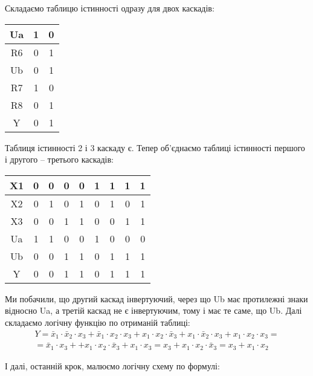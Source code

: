 \documentclass[a4paper,14pt]{extreport}
\begin{document}
Складаємо таблицю істинності одразу для двох каскадів:

\begin{table}[h]
  \begin{center}
  \begin{tabular}{|c|c|c|}
  \hline
  Ua & 1 & 0 \\ \hline
  R6 & 0 & 1 \\ \hline
  Ub & 0 & 1 \\ \hline
  R7 & 1 & 0 \\ \hline
  R8 & 0 & 1 \\ \hline
  Y  & 0 & 1 \\ \hline
  \end{tabular}
  \end{center}
\end{table}

Таблиця істинності 2 і 3 каскаду є. Тепер об’єднаємо таблиці істинності першого і другого – третього каскадів:


\begin{table}[h]
  \begin{center}
\begin{tabular}{|c|c|c|c|c|c|c|c|c|}
\hline
X1 & 0 & 0 & 0 & 0 & 1 & 1 & 1 & 1 \\ \hline
X2 & 0 & 1 & 0 & 1 & 0 & 1 & 0 & 1 \\ \hline
X3 & 0 & 0 & 1 & 1 & 0 & 0 & 1 & 1 \\ \hline
Ua & 1 & 1 & 0 & 0 & 1 & 0 & 0 & 0 \\ \hline
Ub & 0 & 0 & 1 & 1 & 0 & 1 & 1 & 1 \\ \hline
Y  & 0 & 0 & 1 & 1 & 0 & 1 & 1 & 1 \\ \hline
\end{tabular}
  \end{center}
\end{table}

Ми побачили, що другий каскад інвертуючий, через що Ub має протилежні знаки відносно Ua, а третій каскад не є інвертуючим, тому і має те саме, що Ub.
Далі складаємо логічну функцію по отриманій таблиці:
\begin{equation}
\begin{array}{l}
Y=\bar{x}_{1} \cdot \bar{x}_{2} \cdot x_{3}+\bar{x}_{1} \cdot x_{2} \cdot x_{3}+x_{1} \cdot x_{2} \cdot \bar{x}_{3}+x_{1} \cdot \bar{x}_{2} \cdot x_{3}+x_{1} \cdot x_{2} \cdot x_{3}= \\
=\bar{x}_{1} \cdot x_{3}++x_{1} \cdot x_{2} \cdot \bar{x}_{3}+x_{1} \cdot x_{3}=x_{3}+x_{1} \cdot x_{2} \cdot \bar{x}_{3}=x_{3}+x_{1} \cdot x_{2}
\end{array}
\end{equation}



І далі, останній крок, малюємо логічну схему по формулі:


\begin{figure}[h!]
\label{ris6}
\end{figure}
\end{document}
